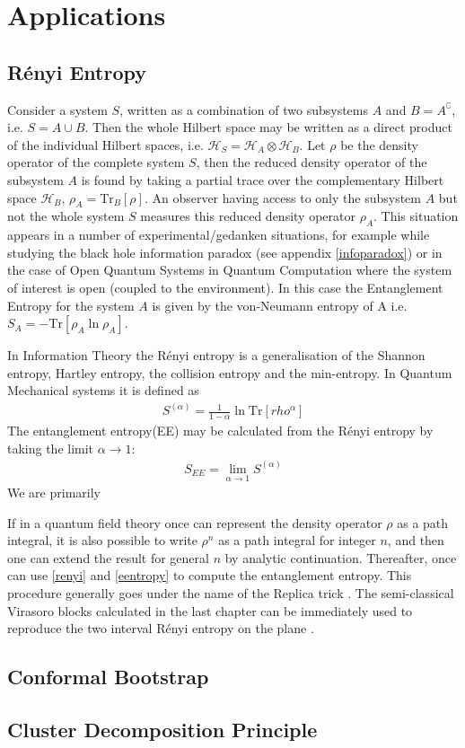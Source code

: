   \chapter{Applications}
  \section{R\'enyi Entropy}
  Consider a system $S$, written as a combination of two subsystems $A$ and $B=A^\complement$, i.e. $S=A \cup B$. Then the whole Hilbert space may be written as a direct product of the individual Hilbert spaces, i.e. $\mathcal{H}_S= \mathcal{H}_A \otimes \mathcal{H}_B$. Let $\rho$ be the density operator of the complete system $S$, then the reduced density operator of the subsystem $A$ is found by taking a partial trace over the complementary Hilbert space $\mathcal{H}_B$, $\rho_A = \text{Tr}_B[\rho]$. An observer having access to only the subsystem $A$ but not the whole system $S$ measures this reduced density operator $\rho_A$. This situation appears in a number of experimental/gedanken situations, for example while studying the black hole information paradox (see appendix \ref{infoparadox}) or in the case of Open Quantum Systems in Quantum Computation where the system of interest is open (coupled to the environment). In this case the Entanglement Entropy for the system $A$ is given by the von-Neumann entropy of A i.e. $S_A=-\text{Tr}[\rho_A \ln \rho_A]$. 
  
  In Information Theory the R\'{e}nyi entropy is a generalisation of the Shannon entropy, Hartley entropy, the collision entropy and the min-entropy. In Quantum Mechanical systems it is defined as 
  \begin{align}
   S^{(\alpha)} = \frac{1}{1-\alpha} \ln \text{Tr}[rho^\alpha] \label{renyi} 
  \end{align}
  The entanglement entropy(EE) may be calculated from the R\'{e}nyi entropy by taking the limit $\alpha \to 1$:
  \begin{align}
   S_{EE} = \lim_{\alpha \to 1}  S^{(\alpha)} \label{eentropy}
  \end{align}
  We are primarily 
  
  If in a quantum field theory once can represent the density operator $\rho$ as a path integral, it is also possible to write $\rho^n$ as a path integral for integer $n$, and then one can extend the result for general $n$ by analytic continuation. Thereafter, once can use \ref{renyi} and \ref{eentropy} to compute the entanglement entropy. This procedure generally goes under the name of the Replica trick \cite{Calabrese:2004eu}.
The semi-classical Virasoro blocks calculated in the last chapter can be immediately used to reproduce the two interval R\'{e}nyi entropy on the plane \cite{Perlmutter:2015iya}. 
  \section{Conformal Bootstrap}
  \section{Cluster Decomposition Principle}